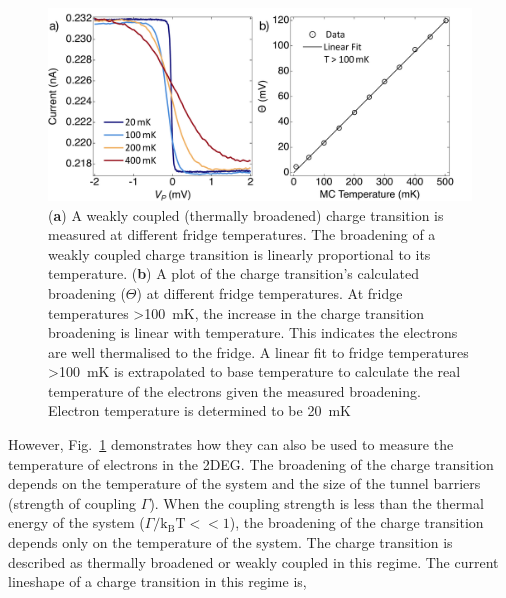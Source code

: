 \begin{figure}[!htb]
 \begin{center}
  \includegraphics[width=1.0\textwidth]{figures/ch1/figure7.pdf}
  \caption[Determining Electron Temperature]{\label{fig:ch1/electron_temp} 
  (\textbf{a}) A weakly coupled (thermally broadened) charge transition is measured at different fridge temperatures. The broadening of a weakly coupled charge transition is linearly proportional to its temperature. (\textbf{b}) A plot of the charge transition's calculated broadening ($\Theta$) at different fridge temperatures. At fridge temperatures \qty{>100}{mK}, the increase in the charge transition broadening is linear with temperature. This indicates the electrons are well thermalised to the fridge. A linear fit to fridge temperatures \qty{>100}{mK} is extrapolated to base temperature to calculate the real temperature of the electrons given the measured broadening. Electron temperature is determined to be \qty{20}{mK}
   }
 \end{center}
\end{figure}



However, Fig.~\ref{fig:ch1/electron_temp} demonstrates how they can also be used to measure the temperature of electrons in the 2DEG. The broadening of the charge transition depends on the temperature of the system and the size of the tunnel barriers (strength of coupling $\Gamma$). When the coupling strength is less than the thermal energy of the system ($\Gamma/\mathrm{k_BT} << 1$), the broadening of the charge transition depends only on the temperature of the system. The charge transition is described as thermally broadened or weakly coupled in this regime. The current lineshape of a charge transition in this regime is,



